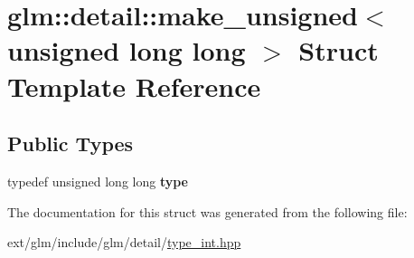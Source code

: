 \hypertarget{structglm_1_1detail_1_1make__unsigned_3_01unsigned_01long_01long_01_4}{\section{glm\-:\-:detail\-:\-:make\-\_\-unsigned$<$ unsigned long long $>$ Struct Template Reference}
\label{structglm_1_1detail_1_1make__unsigned_3_01unsigned_01long_01long_01_4}
}
\subsection*{Public Types}
\begin{DoxyCompactItemize}
\item 
\hypertarget{structglm_1_1detail_1_1make__unsigned_3_01unsigned_01long_01long_01_4_a3f3f1eb1cbdd286e6cb4afb5fa71d5c7}{typedef unsigned long long {\bfseries type}}\label{structglm_1_1detail_1_1make__unsigned_3_01unsigned_01long_01long_01_4_a3f3f1eb1cbdd286e6cb4afb5fa71d5c7}

\end{DoxyCompactItemize}


The documentation for this struct was generated from the following file\-:\begin{DoxyCompactItemize}
\item 
ext/glm/include/glm/detail/\hyperlink{type__int_8hpp}{type\-\_\-int.\-hpp}\end{DoxyCompactItemize}
